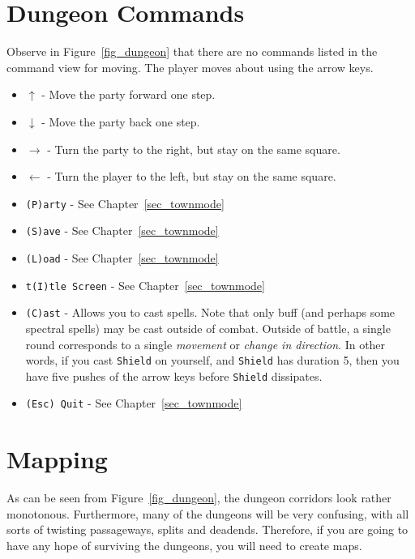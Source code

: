 \documentclass{report}
\begin{document}
\begin{itemize}
\begin{itemize}
\section{Dungeon Commands}
    Observe in Figure~\ref{fig_dungeon} that there are no commands listed in the command view for moving. The player moves about using the arrow keys.
    \begin{itemize}
        \item {\color{green!50!black} $\uparrow$} - Move the party forward one step.
        \item {\color{green!50!black} $\downarrow$} - Move the party back one step.
        \item {\color{green!50!black} $\rightarrow$} - Turn the party to the right, but stay on the same square.
        \item {\color{green!50!black} $\leftarrow$} - Turn the player to the left, but stay on the same square.
        \item \verb|(P)arty| - See Chapter~\ref{sec_townmode}
        \item \verb|(S)ave| - See Chapter~\ref{sec_townmode}
        \item \verb|(L)oad| - See Chapter~\ref{sec_townmode}
        \item \verb|t(I)tle Screen| - See Chapter~\ref{sec_townmode}
        \item \verb|(C)ast| - Allows you to cast spells. Note that only buff
        (and perhaps some spectral spells) may be cast outside of combat. Outside
        of battle, a single round corresponds to a single \emph{movement} or
        \emph{change in direction}. In 
        other words, if you cast \verb|Shield| on yourself, and \verb|Shield| has
        duration 5, then you have five pushes of the arrow keys before 
        \verb|Shield| dissipates.
        \item \verb|(Esc) Quit| - See Chapter~\ref{sec_townmode}
    \end{itemize}

\section{Mapping}
    As can be seen from Figure~\ref{fig_dungeon}, the dungeon corridors look rather
    monotonous. Furthermore, many of the dungeons will be very confusing, with all
    sorts of twisting passageways, splits and deadends. Therefore, if you are going
    to have any hope of surviving the dungeons, you will need to create maps. 


\end{itemize}
\end{itemize}
\end{document}
